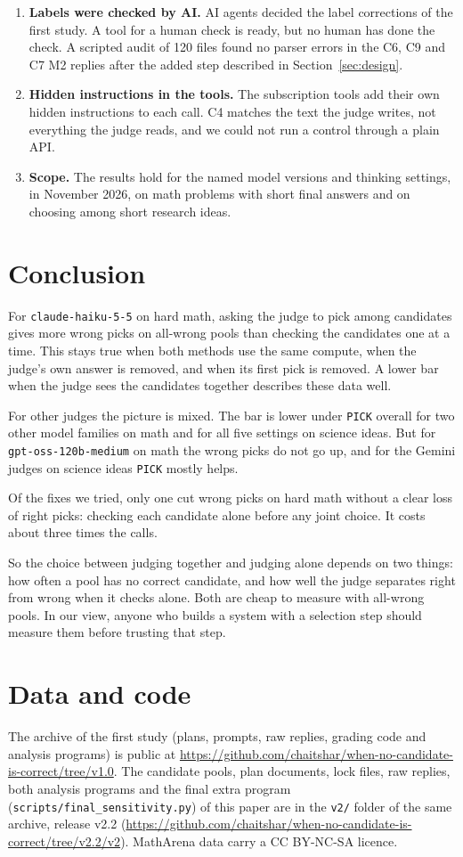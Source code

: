 \documentclass[10pt,twocolumn]{article}
\begin{document}
\begin{enumerate}
\item \textbf{Labels were checked by AI.} AI agents decided the label corrections of the first study. A tool for a human check is ready, but no human has done the check. A scripted audit of 120 files found no parser errors in the C6, C9 and C7 M2 replies after the added step described in Section~\ref{sec:design}.
\item \textbf{Hidden instructions in the tools.} The subscription tools add their own hidden instructions to each call. C4 matches the text the judge writes, not everything the judge reads, and we could not run a control through a plain API.
\item \textbf{Scope.} The results hold for the named model versions and thinking settings, in November 2026, on math problems with short final answers and on choosing among short research ideas.
\end{enumerate}

\section{Conclusion}
For \texttt{claude-haiku-5-5} on hard math, asking the judge to pick among candidates gives more wrong picks on all-wrong pools than checking the candidates one at a time. This stays true when both methods use the same compute, when the judge's own answer is removed, and when its first pick is removed. A lower bar when the judge sees the candidates together describes these data well.

For other judges the picture is mixed. The bar is lower under \texttt{PICK} overall for two other model families on math and for all five settings on science ideas. But for \texttt{gpt-oss-120b-medium} on math the wrong picks do not go up, and for the Gemini judges on science ideas \texttt{PICK} mostly helps.

Of the fixes we tried, only one cut wrong picks on hard math without a clear loss of right picks: checking each candidate alone before any joint choice. It costs about three times the calls.

So the choice between judging together and judging alone depends on two things: how often a pool has no correct candidate, and how well the judge separates right from wrong when it checks alone. Both are cheap to measure with all-wrong pools. In our view, anyone who builds a system with a selection step should measure them before trusting that step.

\section*{Data and code}
The archive of the first study (plans, prompts, raw replies, grading code and analysis programs) is public at \url{https://github.com/chaitshar/when-no-candidate-is-correct/tree/v1.0}. The candidate pools, plan documents, lock files, raw replies, both analysis programs and the final extra program (\texttt{scripts/final\_sensitivity.py}) of this paper are in the \texttt{v2/} folder of the same archive, release v2.2 (\url{https://github.com/chaitshar/when-no-candidate-is-correct/tree/v2.2/v2}). MathArena data carry a CC BY-NC-SA licence.
\end{document}
